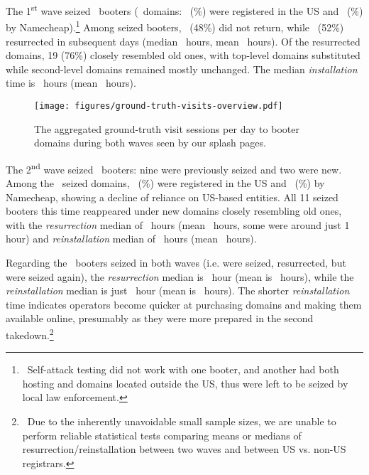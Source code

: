\documentclass[letterpaper,twocolumn,10pt]{article}
\begin{document}
The 1\textsuperscript{st} wave seized \BTnFirstWaveSeizedBooters~booters (\BTnFirstWaveSeizedDomains~domains: \BTnFirstWaveUSRegistrar~(\BTnFirstWaveUSRegistrarProps\%) were registered in the US and \BTnFirstWaveNameCheapRegistrar~(\BTnFirstWaveNameCheapRegistrarProps\%) by Namecheap).\footnote{~Self-attack testing did not work with one booter, and another had both hosting and domains located outside the US, thus were left to be seized by local law enforcement.} Among seized booters, \BTnFirstWaveGaveUpBooters~(48\%) did not return, while \BTnFirstWaveResurrectedBooters~(52\%) resurrected in subsequent days (median \BTnMedianFirstWaveResurrection~hours, mean \BTnMeanFirstWaveResurrection~hours). Of the resurrected domains, 19 (76\%) closely resembled old ones, with top-level domains substituted while second-level domains remained mostly unchanged. The median \textit{installation} time is \BTnMedianFirstWaveReinstallation~hours (mean \BTnMeanFirstWaveReinstallation~hours). 

\begin{figure}[t]
    \centering
    \texttt{[image: figures/ground-truth-visits-overview.pdf]}\\
    \caption{The aggregated ground-truth visit sessions per day to booter domains during both waves seen by our splash pages.}
    \label{fig:splash-page-traffic-overview}
\end{figure}
The 2\textsuperscript{nd} wave seized \BTnSecondWaveSeizedBooters~booters: nine were previously seized and two were new. Among the \BTnSecondWaveSeizedDomains~seized domains, \BTnSecondWaveUSRegistrar~(\BTnSecondWaveUSRegistrarProps\%) were registered in the US and \BTnSecondWaveNameCheapRegistrar~(\BTnSecondWaveNameCheapRegistrarProps\%) by Namecheap, showing a decline of reliance on US-based entities. All 11 seized booters this time reappeared under new domains closely resembling old ones, with the \textit{resurrection} median of \BTnMedianSecondWaveResurrection~hours (mean \BTnMeanSecondWaveResurrection~hours, some were around just 1 hour) and \textit{reinstallation} median of \BTnMedianSecondWaveReinstallation~hours (mean \BTnMeanSecondWaveReinstallation~hours).

Regarding the \BTnSecondWaveResurrectedTwiceBooters~booters seized in both waves (i.e. were seized, resurrected, but were seized again), the \textit{resurrection} median is \BTnMedianResurrectionTwiceCombinedBothWave~hour (mean is \BTnMeanResurrectionTwiceCombinedBothWave~hours), while the \textit{reinstallation} median is just \BTnMedianReinstallationTwiceCombinedBothWave~hour (mean is \BTnMeanReinstallationTwiceCombinedBothWave~hours). The shorter \textit{reinstallation} time indicates operators become quicker at purchasing domains and making them available online, presumably as they were more prepared in the second takedown.\footnote{~Due to the inherently unavoidable small sample sizes, we are unable to perform reliable statistical tests comparing means or medians of resurrection/reinstallation between two waves and between US vs. non-US registrars.}
\end{document}
